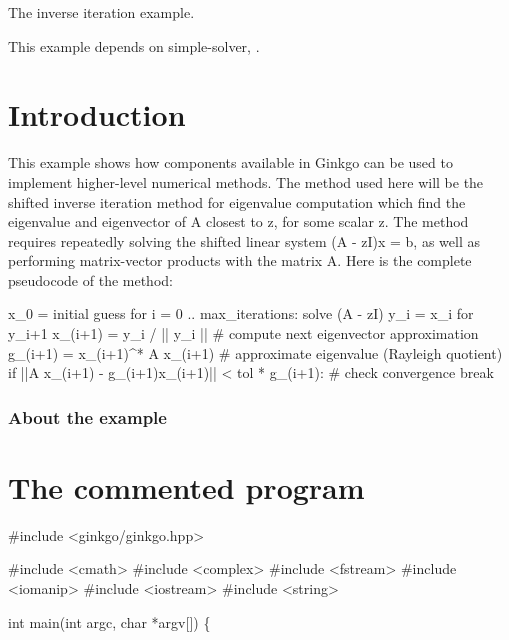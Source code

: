 The inverse iteration example.

This example depends on simple-\/solver, .

 \label{_Intro}%
 \label{_Introduction}%
\section*{Introduction}

This example shows how components available in Ginkgo can be used to implement higher-\/level numerical methods. The method used here will be the shifted inverse iteration method for eigenvalue computation which find the eigenvalue and eigenvector of A closest to z, for some scalar z. The method requires repeatedly solving the shifted linear system (A -\/ zI)x = b, as well as performing matrix-\/vector products with the matrix {\ttfamily A}. Here is the complete pseudocode of the method\+:


\begin{DoxyCode}
x\_0 = initial guess
\textcolor{keywordflow}{for} i = 0 .. max\_iterations:
    solve (A - zI) y\_i = x\_i \textcolor{keywordflow}{for} y\_i+1
    x\_(i+1) = y\_i / || y\_i ||      # compute next eigenvector approximation
    g\_(i+1) = x\_(i+1)^* A x\_(i+1)  \textcolor{preprocessor}{# approximate eigenvalue (Rayleigh quotient)}
    \textcolor{keywordflow}{if} ||A x\_(i+1) - g\_(i+1)x\_(i+1)|| < tol * g\_(i+1):  \textcolor{preprocessor}{# check convergence}
\textcolor{preprocessor}{        break}
\end{DoxyCode}


\label{_Abouttheexample}%
\subsubsection*{About the example }

\label{_CommProg}%
 \section*{The commented program}


\begin{DoxyCode}
\textcolor{preprocessor}{#include <ginkgo/ginkgo.hpp>}


\textcolor{preprocessor}{#include <cmath>}
\textcolor{preprocessor}{#include <complex>}
\textcolor{preprocessor}{#include <fstream>}
\textcolor{preprocessor}{#include <iomanip>}
\textcolor{preprocessor}{#include <iostream>}
\textcolor{preprocessor}{#include <string>}


\textcolor{keywordtype}{int} main(\textcolor{keywordtype}{int} argc, \textcolor{keywordtype}{char} *argv[])
\{
\end{DoxyCode}


